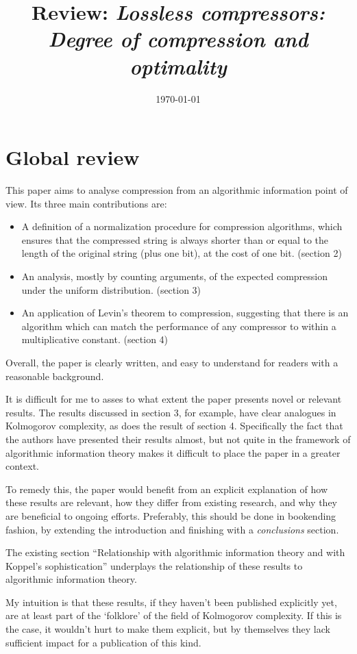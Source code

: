 \documentclass{article}
\title{Review: {\em Lossless compressors: Degree of compression and optimality}}
\date{\today}
\theoremstyle{definition}
\begin{document}
\maketitle

\section{Global review}

This paper aims to analyse compression from an algorithmic information point of view. Its three main contributions are:
\begin{itemize}
  \item A definition of a normalization procedure for compression algorithms, which ensures that the compressed string is always shorter than or equal to the length of the original string (plus one bit), at the cost of one bit. (section 2)
  \item An analysis, mostly by counting arguments, of the expected compression under the uniform distribution. (section 3)
  \item An application of Levin's theorem to compression, suggesting that there is an algorithm which can match the performance of any compressor to within a multiplicative constant. (section 4)
\end{itemize}

Overall, the paper is clearly written, and easy to understand for readers with a reasonable background.

It is difficult for me to asses to what extent the paper presents novel or relevant results. The results discussed in section 3, for example, have clear analogues in Kolmogorov complexity, as does the result of section 4. Specifically the fact that the authors have presented their results almost, but not quite in the framework of algorithmic information theory makes it difficult to place the paper in a greater context.

To remedy this, the paper would benefit from an explicit explanation of how these results are relevant, how they differ from existing research, and why they are beneficial to ongoing efforts. Preferably, this should be done in bookending fashion, by extending the introduction and finishing with a \emph{conclusions} section.

The existing section ``Relationship with algorithmic information theory and with Koppel's sophistication'' underplays the relationship of these results to algorithmic information theory.

My intuition is that these results, if they haven't been published explicitly yet, are at least part of the `folklore' of the field of Kolmogorov complexity. If this is the case, it wouldn't hurt to make them explicit, but by themselves they lack sufficient impact for a publication of this kind.
\end{document}
